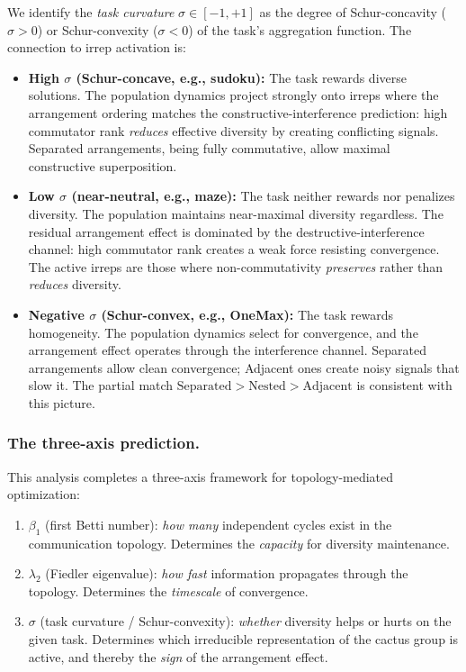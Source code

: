 We identify the \emph{task curvature}
$\sigma \in [-1, +1]$ as the degree of Schur-concavity ($\sigma > 0$)
or Schur-convexity ($\sigma < 0$) of the task's aggregation function.
The connection to irrep activation is:

\begin{itemize}
\item \textbf{High $\sigma$ (Schur-concave, e.g., sudoku):}
  The task rewards diverse solutions.  The population dynamics project
  strongly onto irreps where the arrangement ordering matches the
  constructive-interference prediction: high commutator rank
  \emph{reduces} effective diversity by creating conflicting signals.
  Separated arrangements, being fully commutative, allow maximal
  constructive superposition.

\item \textbf{Low $\sigma$ (near-neutral, e.g., maze):}
  The task neither rewards nor penalizes diversity.  The population
  maintains near-maximal diversity regardless.  The residual
  arrangement effect is dominated by the destructive-interference
  channel: high commutator rank creates a weak force resisting
  convergence.  The active irreps are those where non-commutativity
  \emph{preserves} rather than \emph{reduces} diversity.

\item \textbf{Negative $\sigma$ (Schur-convex, e.g., OneMax):}
  The task rewards homogeneity.  The population dynamics select for
  convergence, and the arrangement effect operates through the
  interference channel.  Separated arrangements allow clean
  convergence; Adjacent ones create noisy signals that slow it.
  The partial match $\text{Separated} > \text{Nested} >
  \text{Adjacent}$ is consistent with this picture.
\end{itemize}

\subsubsection{The three-axis prediction.}

This analysis completes a three-axis framework for topology-mediated
optimization:

\begin{enumerate}
\item $\beta_1$ (first Betti number): \emph{how many} independent
  cycles exist in the communication topology.  Determines the
  \emph{capacity} for diversity maintenance.

\item $\lambda_2$ (Fiedler eigenvalue): \emph{how fast} information
  propagates through the topology.  Determines the \emph{timescale}
  of convergence.

\item $\sigma$ (task curvature / Schur-convexity): \emph{whether}
  diversity helps or hurts on the given task.  Determines which
  irreducible representation of the cactus group is active, and
  thereby the \emph{sign} of the arrangement effect.
\end{enumerate}

